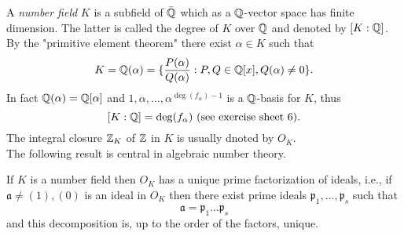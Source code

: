 \documentclass[NumTh.tex]{subfiles}
\begin{document}
A \emph{number field} $K$ is a subfield of $\bar{\mathbb{Q}}$ which as a $\mathbb{Q}$-vector space has finite dimension.
The latter is called the degree of $K$ over $\mathbb{Q}$ and denoted by $[K:\mathbb{Q}]$.
By the "primitive element theorem" there exist $\alpha \in K$ such that 
\[ K = \mathbb{Q}(\alpha) = \{ \frac{P(\alpha)}{Q(\alpha)} : P,Q \in \mathbb{Q}[x], Q(\alpha) \neq 0 \} \text{.} \]
In fact $\mathbb{Q}(\alpha) = \mathbb{Q}[\alpha]$ and $1,\alpha,\dots,\alpha^{\deg(f_\alpha) - 1}$ is a $\mathbb{Q}$-basis for $K$,
thus 
\[ [K:\mathbb{Q}] = \deg(f_\alpha) \text{ (see exercise sheet 6).} \]
The integral closure $\mathbb{Z}_K$ of $\mathbb{Z}$ in $K$ is usually dnoted by $O_K$.\\

The following result is central in algebraic number theory.

\begin{theorem}\label{th_3_3_6}
  If $K$ is a number field then $O_K$ has a unique prime factorization of ideals,
  i.e., if $\mathfrak{a} \neq (1),(0)$ is an ideal in $O_K$ then there exist prime ideals $\mathfrak{p}_1,\dots,\mathfrak{p}_s$ such that
  \[ \mathfrak{a} = \mathfrak{p}_1 \dots \mathfrak{p}_s \]
  and this decomposition is, up to the order of the factors, unique.
\end{theorem}
\end{document}
